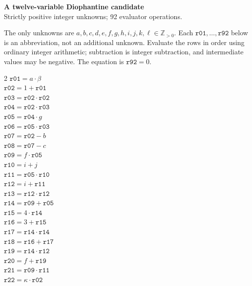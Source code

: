 \documentclass[10pt]{article}
\begin{document}
\begin{center}
{\large\bfseries A twelve-variable Diophantine candidate}\\
{\small Strictly positive integer unknowns; 92 evaluator operations.}
\end{center}
The only unknowns are \(a,b,c,d,e,f,g,h,i,j,k,\ell\in\mathbb Z_{>0}\).
Each \(\mathtt{r01},\ldots,\mathtt{r92}\) below is an abbreviation,
not an additional unknown. Evaluate the rows in order using ordinary integer
arithmetic; subtraction is integer subtraction, and intermediate values may be
negative. The equation is
\(\boxed{\mathtt{r92}=0}\).

\begin{multicols}{2}\small
\(\mathtt{r01} = a \cdot \beta\)\\
\(\mathtt{r02} = 1 + \mathtt{r01}\)\\
\(\mathtt{r03} = \mathtt{r02} \cdot \mathtt{r02}\)\\
\(\mathtt{r04} = \mathtt{r02} \cdot \mathtt{r03}\)\\
\(\mathtt{r05} = \mathtt{r04} \cdot g\)\\
\(\mathtt{r06} = \mathtt{r05} \cdot \mathtt{r03}\)\\
\(\mathtt{r07} = \mathtt{r02} - b\)\\
\(\mathtt{r08} = \mathtt{r07} - c\)\\
\(\mathtt{r09} = f \cdot \mathtt{r05}\)\\
\(\mathtt{r10} = i + j\)\\
\(\mathtt{r11} = \mathtt{r05} \cdot \mathtt{r10}\)\\
\(\mathtt{r12} = i + \mathtt{r11}\)\\
\(\mathtt{r13} = \mathtt{r12} \cdot \mathtt{r12}\)\\
\(\mathtt{r14} = \mathtt{r09} + \mathtt{r05}\)\\
\(\mathtt{r15} = 4 \cdot \mathtt{r14}\)\\
\(\mathtt{r16} = 3 + \mathtt{r15}\)\\
\(\mathtt{r17} = \mathtt{r14} \cdot \mathtt{r14}\)\\
\(\mathtt{r18} = \mathtt{r16} + \mathtt{r17}\)\\
\(\mathtt{r19} = \mathtt{r14} \cdot \mathtt{r12}\)\\
\(\mathtt{r20} = f + \mathtt{r19}\)\\
\(\mathtt{r21} = \mathtt{r09} \cdot \mathtt{r11}\)\\
\(\mathtt{r22} = \kappa \cdot \mathtt{r02}\)\\

\end{multicols}
\end{document}
